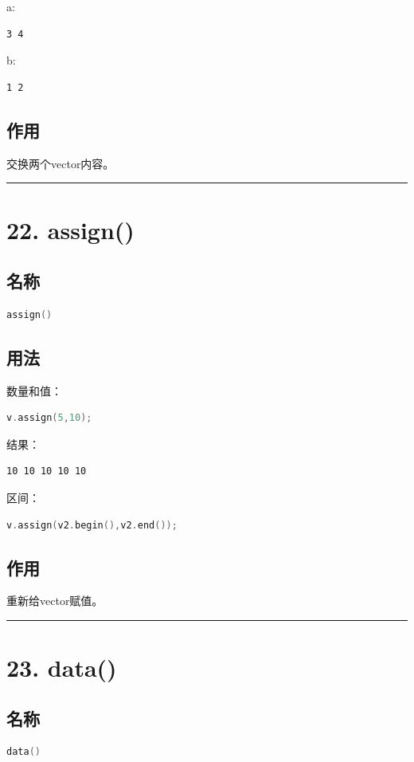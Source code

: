 \documentclass[10pt,twocolumn]{extarticle}
\begin{document}
a:
\begin{lstlisting}
3 4
\end{lstlisting}
b:
\begin{lstlisting}
1 2
\end{lstlisting}

\subsection{作用}
交换两个vector内容。

\noindent\rule{\linewidth}{0.4pt}

\section{22. assign()}

\subsection{名称}
\begin{lstlisting}[language=C++]
assign()
\end{lstlisting}

\subsection{用法}
数量和值：
\begin{lstlisting}[language=C++]
v.assign(5,10);
\end{lstlisting}
结果：
\begin{lstlisting}
10 10 10 10 10
\end{lstlisting}

区间：
\begin{lstlisting}[language=C++]
v.assign(v2.begin(),v2.end());
\end{lstlisting}

\subsection{作用}
重新给vector赋值。

\noindent\rule{\linewidth}{0.4pt}

\section{23. data()}

\subsection{名称}
\begin{lstlisting}[language=C++]
data()
\end{lstlisting}
\end{document}
